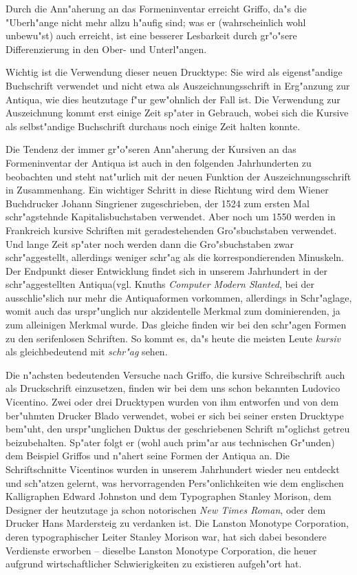 \documentclass[draft,12pt,a4paper,german]{article}
\begin{document}
Durch die Ann"aherung an das Formeninventar erreicht Griffo, da"s die
"Uberh"ange nicht mehr allzu h"aufig sind; was er (wahrscheinlich wohl
unbewu"st) auch erreicht, ist eine besserer Lesbarkeit durch gr"o"sere
Differenzierung in den Ober- und Unterl"angen. 

Wichtig ist die Verwendung dieser neuen Drucktype: Sie wird als
eigenst"andige Buchschrift verwendet und nicht etwa als Auszeichnungsschrift
in Erg"anzung zur Antiqua, wie dies heutzutage f"ur gew"ohnlich der Fall ist.
Die Verwendung zur Auszeichnung kommt erst einige Zeit sp"ater in Gebrauch,
wobei sich die Kursive als selbst"andige Buchschrift durchaus noch einige
Zeit halten konnte.  

Die Tendenz der immer gr"o"seren Ann"aherung der Kursiven an das
Formeninventar der Antiqua ist auch in den folgenden Jahrhunderten
zu beobachten und steht nat"urlich mit der neuen Funktion der
Auszeichnungsschrift in Zusammenhang. Ein wichtiger Schritt in diese
Richtung wird dem Wiener Buchdrucker Johann Singriener zugeschrieben, der
1524 zum ersten Mal schr"agstehnde Kapitalisbuchstaben verwendet. Aber noch
um 1550 werden in Frankreich kursive Schriften mit geradestehenden
Gro"sbuchstaben verwendet. Und lange Zeit sp"ater noch werden  dann die
Gro"sbuchstaben zwar schr"aggestellt, allerdings weniger schr"ag als die
korrespondierenden Minuskeln. Der Endpunkt
dieser Entwicklung findet sich in unserem Jahrhundert in der
\glqq schr"aggestellten Antiqua\grqq  (vgl. Knuths \emph{Computer Modern
Slanted}, bei
der ausschlie"slich nur mehr die Antiquaformen vorkommen, allerdings in
Schr"aglage, womit auch das urspr"unglich nur akzidentelle Merkmal zum
dominierenden, ja zum alleinigen Merkmal wurde. Das gleiche finden wir bei
den schr"agen Formen zu den serifenlosen Schriften. So kommt es, da"s heute
die meisten Leute \emph{kursiv} als gleichbedeutend mit \emph{schr"ag} sehen.

Die n"achsten bedeutenden Versuche nach Griffo, die kursive Schreibschrift
auch als Druckschrift einzusetzen, finden wir bei dem uns schon bekannten
Ludovico Vicentino. Zwei oder drei Drucktypen wurden von ihm entworfen und
von dem ber"uhmten Drucker Blado verwendet, wobei er sich bei seiner ersten
Drucktype bem"uht, den urspr"unglichen Duktus der geschriebenen Schrift
m"oglichst getreu beizubehalten. Sp"ater folgt er (wohl auch prim"ar aus
technischen Gr"unden) dem Beispiel Griffos und n"ahert seine Formen der
Antiqua an. Die Schriftschnitte Vicentinos wurden in unserem Jahrhundert
wieder neu entdeckt und sch"atzen gelernt, was hervorragenden
Pers"onlichkeiten wie dem englischen Kalligraphen Edward Johnston und dem
Typographen Stanley Morison, dem Designer der heutzutage ja schon
notorischen \emph{New Times Roman}, oder dem Drucker Hans Mardersteig zu
verdanken ist. Die Lanston Monotype Corporation, deren typographischer Leiter
Stanley Morison war, hat sich dabei besondere Verdienste erworben -- dieselbe
Lanston Monotype Corporation, die heuer aufgrund wirtschaftlicher
Schwierigkeiten zu existieren aufgeh"ort hat.
\end{document}
